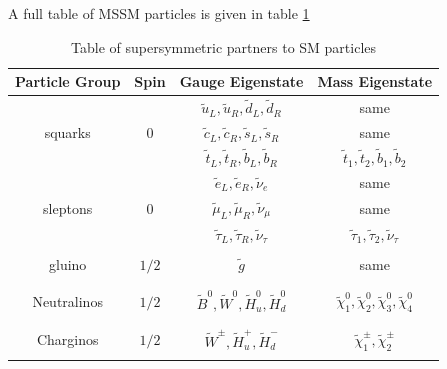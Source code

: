 A full table of MSSM particles is given in table \ref{tab:MSSMParticles}

\begin{table}[H]
\begin{center}
\begin{tabular}{ c c c c }
\toprule
Particle Group    & Spin     & Gauge Eigenstate     & Mass Eigenstate \\
\midrule 
\vspace{3mm}
        &         & $\tilde{u}_{L}, \tilde{u}_{R}, \tilde{d}_{L}, \tilde{d}_{R}$    & same    \\
\vspace{3mm}
squarks     & $0$    & $\tilde{c}_{L}, \tilde{c}_{R}, \tilde{s}_{L}, \tilde{s}_{R}$    & same    \\
\vspace{3mm}
        &         & $\tilde{t}_{L}, \tilde{t}_{R}, \tilde{b}_{L}, \tilde{b}_{R}$    & $\tilde{t}_{1}, \tilde{t}_{2}, \tilde{b}_{1}, \tilde{b}_{2}$    \\

\hline 

\vspace{3mm}
        &         & $\tilde{e}_{L}, \tilde{e}_{R}, \tilde{\nu}_{e}$        & same    \\
\vspace{3mm}
sleptons     & $0$    & $\tilde{\mu}_{L}, \tilde{\mu}_{R}, \tilde{\nu}_{\mu}$    & same    \\
\vspace{3mm}
        &         & $\tilde{\tau}_{L}, \tilde{\tau}_{R}, \tilde{\nu}_{\tau}$    & $\tilde{\tau}_{1}, \tilde{\tau}_{2}, \tilde{\nu}_{\tau}$    \\    
        
\hline \\

gluino    & $1/2$    & $\tilde{g}$    &    same \\
\\
\hline \\

Neutralinos    & $1/2$    & $\tilde{B}^{0}, \tilde{W}^{0}, \tilde{H}^{0}_{u}, \tilde{H}^{0}_{d}$& $\tilde{\chi}^{0}_{1}, \tilde{\chi}^{0}_{2}, \tilde{\chi}^{0}_{3}, \tilde{\chi}^{0}_{4}$ \\
\\
\hline \\

Charginos        & $1/2$    & $\tilde{W}^{\pm}, \tilde{H}^{+}_{u}, \tilde{H}^{-}_{d}$& $\tilde{\chi}^{\pm}_{1}, \tilde{\chi}^{\pm}_{2}$ \\
\\
\bottomrule
\end{tabular}
\caption{Table of supersymmetric partners to SM particles}
\label{tab:MSSMParticles}
\end{center}
\end{table}


